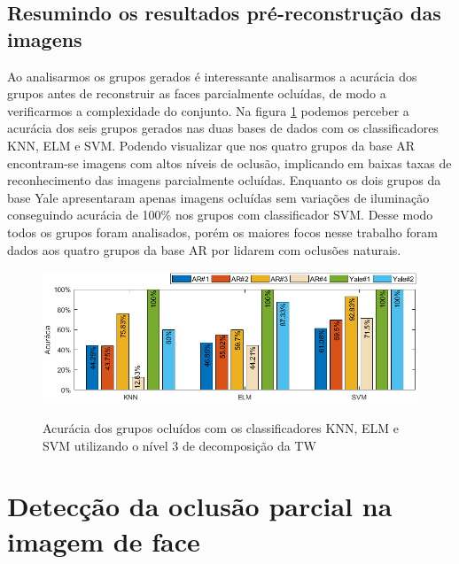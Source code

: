 \subsection{Resumindo os resultados pré-reconstrução das imagens}

Ao analisarmos os grupos gerados é interessante analisarmos a acurácia dos grupos antes de reconstruir as faces parcialmente ocluídas, de modo a verificarmos a complexidade do conjunto. Na figura \ref{fig:acuracia_AR_ELM_KNN} podemos perceber a acurácia dos seis grupos gerados nas duas bases de dados com os classificadores KNN, ELM e SVM. Podendo visualizar que nos quatro grupos da base AR encontram-se imagens com altos níveis de oclusão, implicando em baixas taxas de reconhecimento das imagens parcialmente ocluídas. Enquanto os dois grupos da base Yale apresentaram apenas imagens ocluídas sem variações de iluminação conseguindo acurácia de 100\% nos grupos com classificador SVM. Desse modo todos os grupos foram analisados, porém os maiores focos nesse trabalho foram dados aos quatro grupos da base AR por lidarem com oclusões naturais.

\begin{figure}[H]
\centering
\caption{Acurácia dos grupos ocluídos com os classificadores KNN, ELM e SVM utilizando o nível 3 de decomposição da TW}
\includegraphics[scale=0.65]{imgs2/percentual_com_oclusao_AR_ELM}
\label{fig:acuracia_AR_ELM_KNN}
\end{figure}


 
\section{Detecção da oclusão parcial na imagem de face}

